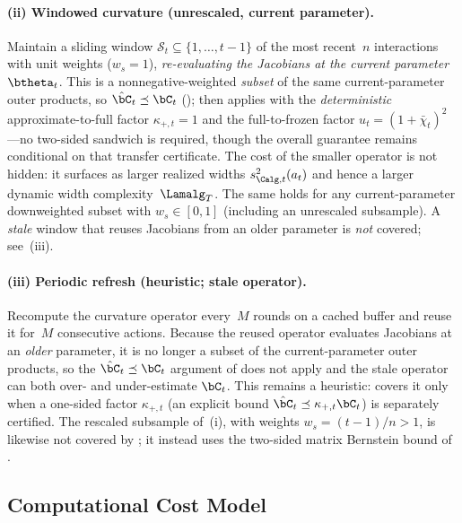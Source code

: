 \paragraph{(ii) Windowed curvature (unrescaled, current parameter).}
Maintain a sliding window $\mathcal{S}_t\subseteq\{1,\dots,t{-}1\}$ of the most
recent~$n$ interactions with unit weights ($w_s{=}1$), \emph{re-evaluating the
Jacobians at the current parameter}~$\btheta_t$.  This is a nonnegative-weighted
\emph{subset} of the same current-parameter outer products, so
$\hat\bC_t\preceq\bC_t$ ();  then
applies with the \emph{deterministic} approximate-to-full factor $\kappa_{+,t}{=}1$
and the full-to-frozen factor $u_t=(1+\bar\chi_t)^2$---no two-sided sandwich is
required, though the overall guarantee remains conditional on that transfer
certificate.  The cost of the
smaller operator is not hidden: it surfaces as larger realized widths
$s_{\Calg,t}^2(a_t)$ and hence a larger dynamic width complexity~$\Lamalg_T$.  The
same holds for any current-parameter downweighted subset with $w_s\in[0,1]$
(including an unrescaled subsample).  A \emph{stale} window that reuses Jacobians
from an older parameter is \emph{not} covered; see~(iii).

\paragraph{(iii) Periodic refresh (heuristic; stale operator).}
Recompute the curvature operator every~$M$ rounds on a cached buffer and reuse it
for~$M$ consecutive actions.  Because the reused operator evaluates Jacobians at
an \emph{older} parameter, it is no longer a subset of the current-parameter
outer products, so the $\hat\bC_t\preceq\bC_t$ argument of  does
not apply and the stale operator can both over- and under-estimate $\bC_t$.  This
remains a heuristic:  covers it only when a
one-sided factor $\kappa_{+,t}$ (an explicit bound
$\hat\bC_t\preceq\kappa_{+,t}\bC_t$) is separately certified.  The rescaled
subsample of~(i), with weights $w_s=(t{-}1)/n>1$, is
likewise not covered by ; it instead uses the two-sided matrix
Bernstein bound of .

\subsection{Computational Cost Model}\label{sec:systems}

